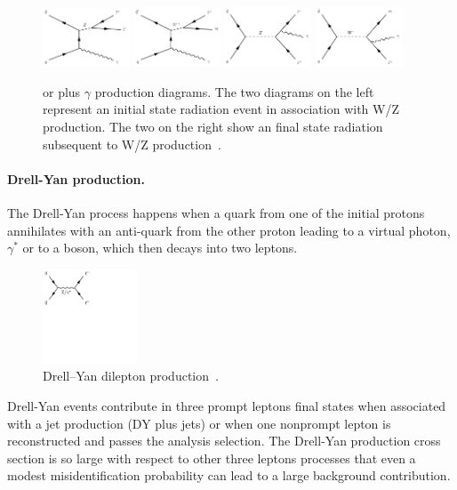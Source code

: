 \begin{figure}[h!]
\centering
  \includegraphics[width=0.23\textwidth]{Figures/c4/dia/40000101.pdf}
  \includegraphics[width=0.23\textwidth]{Figures/c4/dia/40000111.pdf}
  \includegraphics[width=0.23\textwidth]{Figures/c4/dia/40000104.pdf}
  \includegraphics[width=0.23\textwidth]{Figures/c4/dia/40000114.pdf}
  \caption{\PW or \PZ plus $\gamma$ production diagrams. The two
    diagrams on the left represent an initial state
radiation event in association with W/Z production. The two on the
right show an final state
radiation subsequent to W/Z production~\cite{diagram}.}
  \label{fig:c43}
\end{figure}

\paragraph{Drell-Yan production.}\label{sec:c4dy}
The Drell-Yan process happens when a quark from one of the initial
protons annihilates with an anti-quark from the other proton leading to a virtual
photon, $\gamma^{*}$ or to a
\PZ boson, which then decays into two leptons.

\begin{figure}[h!]
\centering
  \includegraphics[clip,trim=0cm 10cm 8.8cm 0cm, width=0.25\textwidth]{Figures/c4/dia/dy.pdf}
 \caption{Drell–Yan dilepton production~\cite{diagram}.}
  \label{fig:c44}
\end{figure}
Drell-Yan events contribute in three prompt leptons final states when
associated with a jet production (DY plus jets) or when one nonprompt
lepton is reconstructed and passes the analysis selection. The Drell-Yan
production cross section is so large with respect to other three
leptons processes that even a modest misidentification probability can
lead to a large background contribution.

